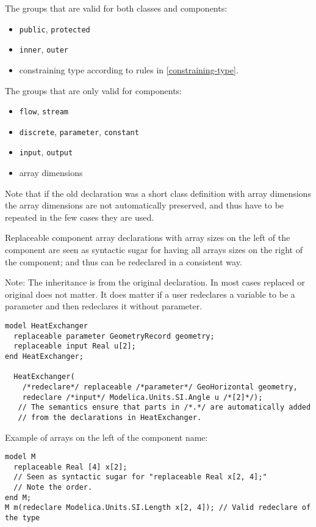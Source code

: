 The groups that are valid for both classes and components:
\begin{itemize}
\item
  \lstinline!public!, \lstinline!protected!
\item
  \lstinline!inner!, \lstinline!outer!
\item
  constraining type according to rules in \cref{constraining-type}.
\end{itemize}

The groups that are only valid for components:
\begin{itemize}
\item
  \lstinline!flow!, \lstinline!stream!
\item
  \lstinline!discrete!, \lstinline!parameter!, \lstinline!constant!
\item
  \lstinline!input!, \lstinline!output!
\item
  array dimensions
\end{itemize}

Note that if the old declaration was a short class definition with array
dimensions the array dimensions are not automatically preserved, and
thus have to be repeated in the few cases they are used.

Replaceable component array declarations with array sizes on the left of
the component are seen as syntactic sugar for having all arrays sizes on
the right of the component; and thus can be redeclared in a consistent
way.

\begin{nonnormative}
Note: The inheritance is from the original declaration. In most
cases replaced or original does not matter. It does matter if a user
redeclares a variable to be a parameter and then redeclares it without
parameter.
\end{nonnormative}

\begin{nonnormative}
\begin{lstlisting}[language=modelica]
model HeatExchanger
  replaceable parameter GeometryRecord geometry;
  replaceable input Real u[2];
end HeatExchanger;

  HeatExchanger(
    /*redeclare*/ replaceable /*parameter*/ GeoHorizontal geometry,
    redeclare /*input*/ Modelica.Units.SI.Angle u /*[2]*/);
   // The semantics ensure that parts in /*.*/ are automatically added
   // from the declarations in HeatExchanger.
\end{lstlisting}

Example of arrays on the left of the component name:
\begin{lstlisting}[language=modelica]
model M
  replaceable Real [4] x[2];
  // Seen as syntactic sugar for "replaceable Real x[2, 4];"
  // Note the order.
end M;
M m(redeclare Modelica.Units.SI.Length x[2, 4]); // Valid redeclare of the type
\end{lstlisting}
\end{nonnormative}

